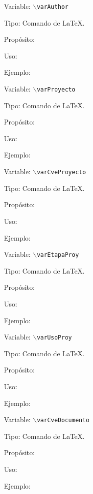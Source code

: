 \begin{Cdescription}
	\item[Variable:] {\tt $\backslash$varAuthor}
	\item[Tipo:] Comando de \LaTeX.
	\item[Propósito:]
	\item[Uso:]
	\item[Ejemplo:]
\end{Cdescription}

\begin{Cdescription}
	\item[Variable:] {\tt $\backslash$varProyecto}
	\item[Tipo:] Comando de \LaTeX.
	\item[Propósito:]
	\item[Uso:]
	\item[Ejemplo:]
\end{Cdescription}

\begin{Cdescription}
	\item[Variable:] {\tt $\backslash$varCveProyecto}
	\item[Tipo:] Comando de \LaTeX.
	\item[Propósito:]
	\item[Uso:]
	\item[Ejemplo:]
\end{Cdescription}

\begin{Cdescription}
	\item[Variable:] {\tt $\backslash$varEtapaProy}
	\item[Tipo:] Comando de \LaTeX.
	\item[Propósito:]
	\item[Uso:]
	\item[Ejemplo:]
\end{Cdescription}

\begin{Cdescription}
	\item[Variable:] {\tt $\backslash$varUsoProy}
	\item[Tipo:] Comando de \LaTeX.
	\item[Propósito:]
	\item[Uso:]
	\item[Ejemplo:]
\end{Cdescription}

\begin{Cdescription}
	\item[Variable:] {\tt $\backslash$varCveDocumento}
	\item[Tipo:] Comando de \LaTeX.
	\item[Propósito:]
	\item[Uso:]
	\item[Ejemplo:]
\end{Cdescription}

